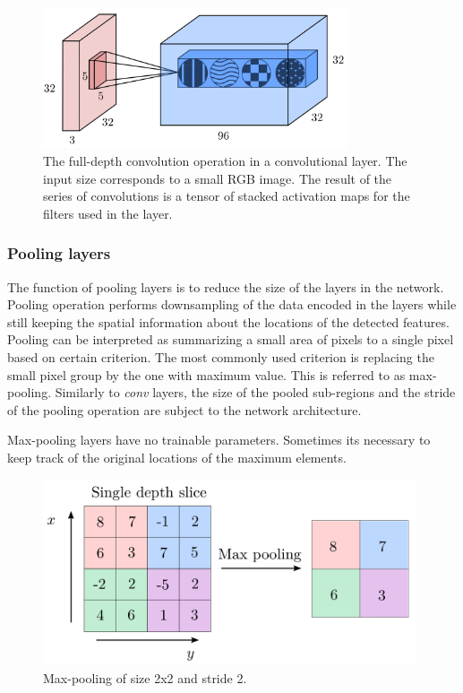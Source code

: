 \vspace{4mm}
\begin{figure}[htb]
	\begin{center}
		\includegraphics*[width=9cm, keepaspectratio]{obr/conv.png}
	\end{center}
	\vspace{4mm}
	\caption{The full-depth convolution operation in a convolutional layer. The input size corresponds to a small RGB image. The result of the series of convolutions is a tensor of stacked activation maps for the filters used in the layer. \cite{coors}} 
	\label{conv}
\end{figure}

\subsubsection{Pooling layers}

The function of pooling layers is to reduce the size of the layers in the network. Pooling operation performs downsampling of the data encoded in the layers while still keeping the spatial information about the locations of the detected features. Pooling can be interpreted as summarizing a small area of pixels to a single pixel based on certain criterion. The most commonly used criterion is replacing the small pixel group by the one with maximum value. This is referred to as max-pooling. Similarly to \textit{conv} layers, the size of the pooled sub-regions and the stride of the pooling operation are subject to the network architecture. \cite{mehlig}

Max-pooling layers have no trainable parameters. Sometimes its necessary to keep track of the original locations of the maximum elements. 

\vspace{4mm}
\begin{figure}[htb]
	\begin{center}
		\includegraphics*[width=11cm, keepaspectratio]{obr/pool.png}
	\end{center}
	\vspace{4mm}
	\caption{Max-pooling of size 2x2 and stride 2. \cite{coors}} 
	\label{pool}
\end{figure}

